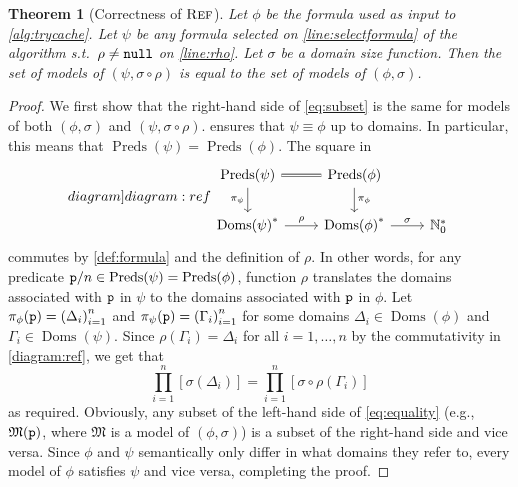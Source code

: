 \documentclass{article}
\newtheorem{theorem}{Theorem}
\newcommand{\predicate}{\texttt{\textup{p}}}
\newcommand{\nulll}{\texttt{\textup{null}}}
\DeclareMathOperator{\Reff}{\textsc{Ref}}
\DeclareMathOperator{\Doms}{Doms}
\DeclareMathOperator{\Preds}{Preds}
\begin{document}
\begin{theorem}[Correctness of $\Reff$]
  Let $\phi$ be the formula used as input to \cref{alg:trycache}. Let $\psi$ be
  any formula selected on \cref{line:selectformula} of the algorithm s.t.\
  $\rho \ne \nulll$ on \cref{line:rho}. Let $\sigma$ be a domain size function.
  Then the set of models of $(\psi, \sigma \circ \rho)$ is equal to the set of
  models of $(\phi, \sigma)$.
\end{theorem}
\begin{proof}
  We first show that the right-hand side of \cref{eq:subset} is the same for
  models of both $(\phi, \sigma)$ and $(\psi, \sigma \circ \rho)$.
  \Cref{alg:trycache} ensures that $\psi \equiv \phi$ up to domains. In
  particular, this means that $\Preds(\psi) = \Preds(\phi)$. The square in
  \begin{equation}\label[diagram]{diagram:ref}
    \begin{tikzcd}
      \Preds(\psi) \ar[equal]{r} \ar[d, swap, "\pi_{\psi}"] & \Preds(\phi) \ar[d, "\pi_{\phi}"] \\
      {\Doms(\psi)}^{\ast} \ar[r, "\rho"] & {\Doms(\phi)}^{\ast} \ar[r, "\sigma"] & \mathbb{N}_{0}^{\ast}
    \end{tikzcd}
  \end{equation}
  commutes by \cref{def:formula} and the definition of $\rho$. In other words,
  for any predicate $\predicate/n \in \Preds(\psi) = \Preds(\phi)$, function
  $\rho$ translates the domains associated with $\predicate$ in $\psi$ to the
  domains associated with $\predicate$ in $\phi$. Let
  $\pi_{\phi}(\predicate) = {(\Delta_{i})}_{i=1}^{n}$ and
  $\pi_{\psi}(\predicate) = {(\Gamma_{i})}_{i=1}^{n}$ for some domains
  $\Delta_{i} \in \Doms(\phi)$ and $\Gamma_{i} \in \Doms(\psi)$. Since
  $\rho(\Gamma_{i}) = \Delta_{i}$ for all $i = 1, \dots, n$ by the commutativity
  in \cref{diagram:ref}, we get that
  \begin{equation}\label{eq:equality}
    \prod_{i=1}^{n}[\sigma(\Delta_{i})] = \prod_{i=1}^{n}[\sigma \circ \rho(\Gamma_{i})]
  \end{equation}
  as required. Obviously, any subset of the left-hand side of \cref{eq:equality}
  (e.g., $\mathfrak{M}(\predicate)$, where $\mathfrak{M}$ is a model of
  $(\phi, \sigma)$) is a subset of the right-hand side and vice versa. Since
  $\phi$ and $\psi$ semantically only differ in what domains they refer to,
  every model of $\phi$ satisfies $\psi$ and vice versa, completing the proof.
\end{proof}
\end{document}
